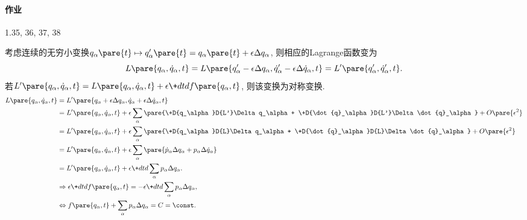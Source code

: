 \documentclass[../LectureNotes.tex]{subfiles}
\begin{document}
\paragraph{作业} %
\label{par:作业}

1.35, 36, 37, 38


\par
考虑连续的无穷小变换$q_\alpha\pare{t}\mapsto q'_\alpha\pare{t} = q_\alpha\pare{t} + \epsilon \Delta q_\alpha$, 则相应的Lagrange函数变为
\[ L\pare{q_\alpha, \dot{q}_\alpha, t} = L\pare{q'_\alpha - \epsilon \Delta q_\alpha, \dot{q}'_\alpha - \epsilon \Delta \dot{q}_\alpha, t} = L'\pare{q'_\alpha, \dot{q}'_\alpha, t}. \]
{\color{red} 若$L'\pare{q_\alpha, \dot{q}_\alpha, t} = L\pare{q_\alpha, \dot{q}_\alpha, t} + \displaystyle \epsilon \+dtd{} f\pare{q_\alpha,t}$, 则该变换为对称变换.}
\begin{align*}
    L\pare{q_\alpha, \dot{q}_\alpha, t} &= L'\pare{q_\alpha+\epsilon\Delta q_\alpha, \dot{q}_\alpha + \epsilon \Delta \dot{q}_\alpha, t} \\
    &= L'\pare{q_\alpha, \dot{q}_\alpha, t} + \epsilon \sum_\alpha \pare{\+D{q_\alpha}D{L'}\Delta q_\alpha + \+D{\dot{q}_\alpha}D{L'}\Delta \dot{q}_\alpha} + O\pare{\epsilon^2} \\
    &= L'\pare{q_\alpha, \dot{q}_\alpha, t} + \epsilon \sum_\alpha \pare{\+D{q_\alpha}D{L}\Delta q_\alpha + \+D{\dot{q}_\alpha}D{L}\Delta \dot{q}_\alpha} + O\pare{\epsilon^2} \\
    &= L'\pare{q_\alpha, \dot{q}_\alpha, t} + \epsilon \sum_\alpha \pare{\dot{p}_\alpha \Delta q_\alpha + p_\alpha \Delta \dot{q}_\alpha} \\
    &= L'\pare{q_\alpha, \dot{q}_\alpha, t} + \epsilon \+dtd{} \sum_{\alpha} p_\alpha \Delta q_\alpha. \\
    &\Rightarrow \epsilon\+dtd{} f\pare{q_\alpha,t} = -\epsilon \+dtd{}\sum_{\alpha} p_\alpha \Delta q_\alpha, \\
    &\Leftrightarrow f\pare{q_\alpha, t} + \sum_\alpha p_\alpha \Delta q_\alpha = C = \const.
\end{align*}
\end{document}
